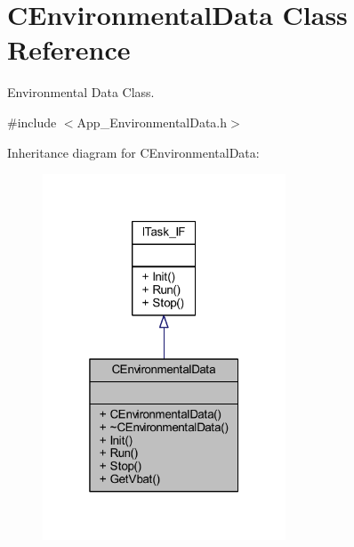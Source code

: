 \hypertarget{class_c_environmental_data}{}\section{C\+Environmental\+Data Class Reference}
\label{class_c_environmental_data}


Environmental Data Class.  




{\ttfamily \#include $<$App\+\_\+\+Environmental\+Data.\+h$>$}



Inheritance diagram for C\+Environmental\+Data\+:
\nopagebreak
\begin{figure}[H]
\begin{center}
\leavevmode
\includegraphics[width=205pt]{class_c_environmental_data__inherit__graph}
\end{center}
\end{figure}


